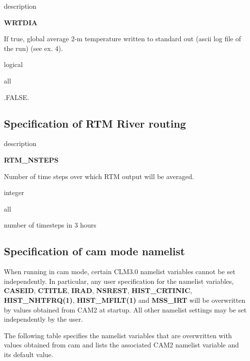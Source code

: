 \begin{Ventry}{description}
 \item[{\bf name}] {\bf WRTDIA}  
 \item[description] 
	If true, global average 2-m temperature 
	written to standard out (ascii log file of the run) (see ex. 4). 
 \item[type] logical  
 \item[mode] all  
 \item[default] .FALSE. 
\end{Ventry}
\bigskip

\subsection {Specification of RTM River routing}
\label{subsec_rtm}

\begin{Ventry}{description}
 \item[{\bf name}] {\bf RTM\_NSTEPS}  
 \item[description] 
	Number of time steps over which RTM output will be averaged.
 \item[type] integer  
 \item[mode] all  
 \item[default] number of timesteps in 3 hours
\end{Ventry}
\bigskip

\subsection {Specification of cam mode namelist}
\label{subsec_cam_namelist}

When running in cam mode, certain CLM3.0 namelist variables cannot be
set independently.  In particular, any user specification for the
namelist variables, {\bf CASEID}, {\bf CTITLE}, {\bf IRAD}, {\bf
NSREST}, {\bf HIST\_CRTINIC}, {\bf HIST\_NHTFRQ(1)}, {\bf
HIST\_MFILT(1)} and {\bf MSS\_IRT} will be overwritten by values
obtained from CAM2 at startup. All other namelist settings may be set
independently by the user.

The following table specifies the namelist variables that are
overwritten with values obtained from cam and lists the associated CAM2
namelist variable and its default value.


